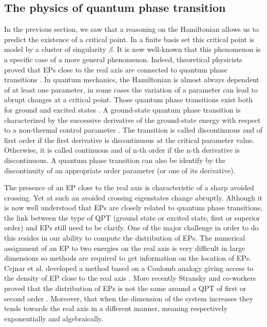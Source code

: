 \documentclass[11pt,a4paper]{article}
\begin{document}
{\subsection{The physics of quantum phase transition}

In the previous section, we saw that a reasoning on the Hamiltonian allows us to predict the existence of a critical point. In a finite basis set this critical point is model by a cluster of singularity $\beta$. It is now well-known that this phenomenon is a specific case of a more general phenomenon. Indeed, theoretical physicists proved that EPs close to the real axis are connected to quantum phase transitions \cite{Heiss_1988, Heiss_2002, Cejnar_2005, Cejnar_2007, Cejnar_2009, Borisov_2015, Sindelka_2017}. In quantum mechanics, the Hamiltonian is almost always dependent of at least one parameter, in some cases the variation of a parameter can lead to abrupt changes at a critical point. Those quantum phase transitions exist both for ground and excited states \cite{Cejnar_2009, Sachdev_2011, Cejnar_2015, Cejnar_2016, Caprio_2008, Macek_2019}. A ground-state quantum phase transition is characterized by the successive derivative of the ground-state energy with respect to a non-thermal control parameter \cite{Cejnar_2009, Sachdev_2011}. The transition is called discontinuous and of first order if the first derivative is discontinuous at the critical parameter value. Otherwise, it is called continuous and of n-th order if the n-th derivative is discontinuous. A quantum phase transition can also be identify by the discontinuity of an appropriate order parameter (or one of its derivative). 

The presence of an EP close to the real axis is characteristic of a sharp avoided crossing. Yet at such an avoided crossing eigenstates change abruptly. Although it is now well understood that EPs are closely related to quantum phase transitions, the link between the type of QPT (ground state or excited state, first or superior order) and EPs still need to be clarify. One of the major challenge in order to do this resides in our ability to compute the distribution of EPs. The numerical assignment of an EP to two energies on the real axis is very difficult in large dimensions so methods are required to get information on the location of EPs. Cejnar et al. developed a method based on a Coulomb analogy giving access to the density of EP close to the real axis \cite{Cejnar_2005, Cejnar_2007}. More recently Stransky and co-workers proved that the distribution of EPs is not the same around a QPT of first or second order \cite{Stransky_2018}. Moreover, that when the dimension of the system increases they tends towards the real axis in a different manner, meaning respectively exponentially and algebraically.

}
\end{document}
